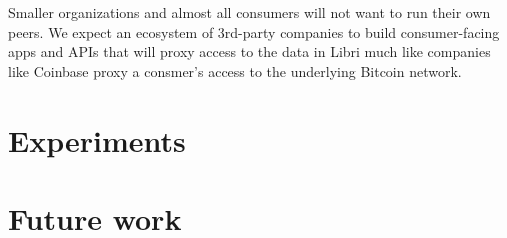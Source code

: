 \documentclass[10pt]{article}
\begin{document}
Smaller organizations and almost all consumers will not want to run their own peers. We expect an ecosystem of 3rd-party companies to build consumer-facing apps and APIs that will proxy access to the data in Libri much like companies like Coinbase proxy a consmer's access to the underlying Bitcoin network.


\section{Experiments}

\section{Future work}
\end{document}
